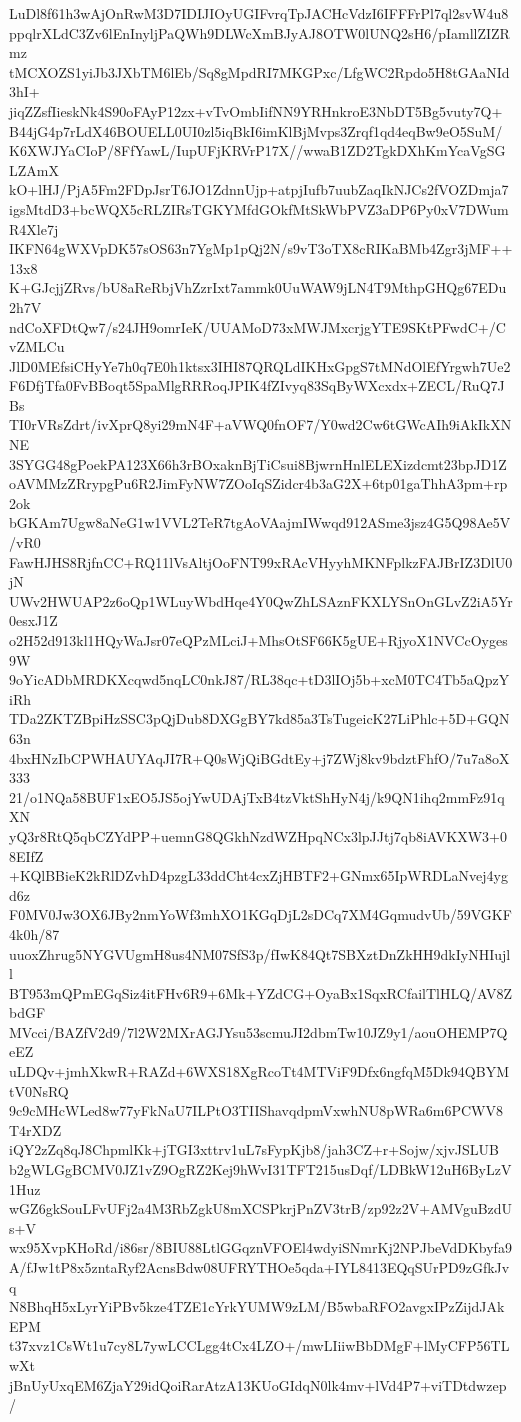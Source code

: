 LuDl8f61h3wAjOnRwM3D7IDIJIOyUGIFvrqTpJACHcVdzI6IFFFrPl7ql2svW4u8
ppqlrXLdC3Zv6lEnInyljPaQWh9DLWcXmBJyAJ8OTW0lUNQ2sH6/pIamllZIZRmz
tMCXOZS1yiJb3JXbTM6lEb/Sq8gMpdRI7MKGPxc/LfgWC2Rpdo5H8tGAaNId3hI+
jiqZZsfIieskNk4S90oFAyP12zx+vTvOmbIifNN9YRHnkroE3NbDT5Bg5vuty7Q+
B44jG4p7rLdX46BOUELL0UI0zl5iqBkI6imKlBjMvps3Zrqf1qd4eqBw9eO5SuM/
K6XWJYaCIoP/8FfYawL/IupUFjKRVrP17X//wwaB1ZD2TgkDXhKmYcaVgSGLZAmX
kO+lHJ/PjA5Fm2FDpJsrT6JO1ZdnnUjp+atpjIufb7uubZaqIkNJCs2fVOZDmja7
igsMtdD3+bcWQX5cRLZIRsTGKYMfdGOkfMtSkWbPVZ3aDP6Py0xV7DWumR4Xle7j
IKFN64gWXVpDK57sOS63n7YgMp1pQj2N/s9vT3oTX8cRIKaBMb4Zgr3jMF++13x8
K+GJcjjZRvs/bU8aReRbjVhZzrIxt7ammk0UuWAW9jLN4T9MthpGHQg67EDu2h7V
ndCoXFDtQw7/s24JH9omrIeK/UUAMoD73xMWJMxcrjgYTE9SKtPFwdC+/CvZMLCu
JlD0MEfsiCHyYe7h0q7E0h1ktsx3IHI87QRQLdIKHxGpgS7tMNdOlEfYrgwh7Ue2
F6DfjTfa0FvBBoqt5SpaMlgRRRoqJPIK4fZIvyq83SqByWXcxdx+ZECL/RuQ7JBs
TI0rVRsZdrt/ivXprQ8yi29mN4F+aVWQ0fnOF7/Y0wd2Cw6tGWcAIh9iAkIkXNNE
3SYGG48gPoekPA123X66h3rBOxaknBjTiCsui8BjwrnHnlELEXizdcmt23bpJD1Z
oAVMMzZRrypgPu6R2JimFyNW7ZOoIqSZidcr4b3aG2X+6tp01gaThhA3pm+rp2ok
bGKAm7Ugw8aNeG1w1VVL2TeR7tgAoVAajmIWwqd912ASme3jsz4G5Q98Ae5V/vR0
FawHJHS8RjfnCC+RQ11lVsAltjOoFNT99xRAcVHyyhMKNFplkzFAJBrIZ3DlU0jN
UWv2HWUAP2z6oQp1WLuyWbdHqe4Y0QwZhLSAznFKXLYSnOnGLvZ2iA5Yr0esxJ1Z
o2H52d913kl1HQyWaJsr07eQPzMLciJ+MhsOtSF66K5gUE+RjyoX1NVCcOyges9W
9oYicADbMRDKXcqwd5nqLC0nkJ87/RL38qc+tD3lIOj5b+xcM0TC4Tb5aQpzYiRh
TDa2ZKTZBpiHzSSC3pQjDub8DXGgBY7kd85a3TsTugeicK27LiPhlc+5D+GQN63n
4bxHNzIbCPWHAUYAqJI7R+Q0sWjQiBGdtEy+j7ZWj8kv9bdztFhfO/7u7a8oX333
21/o1NQa58BUF1xEO5JS5ojYwUDAjTxB4tzVktShHyN4j/k9QN1ihq2mmFz91qXN
yQ3r8RtQ5qbCZYdPP+uemnG8QGkhNzdWZHpqNCx3lpJJtj7qb8iAVKXW3+08EIfZ
+KQlBBieK2kRlDZvhD4pzgL33ddCht4cxZjHBTF2+GNmx65IpWRDLaNvej4ygd6z
F0MV0Jw3OX6JBy2nmYoWf3mhXO1KGqDjL2sDCq7XM4GqmudvUb/59VGKF4k0h/87
uuoxZhrug5NYGVUgmH8us4NM07SfS3p/fIwK84Qt7SBXztDnZkHH9dkIyNHIujll
BT953mQPmEGqSiz4itFHv6R9+6Mk+YZdCG+OyaBx1SqxRCfailTlHLQ/AV8ZbdGF
MVcci/BAZfV2d9/7l2W2MXrAGJYsu53scmuJI2dbmTw10JZ9y1/aouOHEMP7QeEZ
uLDQv+jmhXkwR+RAZd+6WXS18XgRcoTt4MTViF9Dfx6ngfqM5Dk94QBYMtV0NsRQ
9c9cMHcWLed8w77yFkNaU7ILPtO3TIIShavqdpmVxwhNU8pWRa6m6PCWV8T4rXDZ
iQY2zZq8qJ8ChpmlKk+jTGI3xttrv1uL7sFypKjb8/jah3CZ+r+Sojw/xjvJSLUB
b2gWLGgBCMV0JZ1vZ9OgRZ2Kej9hWvI31TFT215usDqf/LDBkW12uH6ByLzV1Huz
wGZ6gkSouLFvUFj2a4M3RbZgkU8mXCSPkrjPnZV3trB/zp92z2V+AMVguBzdUs+V
wx95XvpKHoRd/i86sr/8BIU88LtlGGqznVFOEl4wdyiSNmrKj2NPJbeVdDKbyfa9
A/fJw1tP8x5zntaRyf2AcnsBdw08UFRYTHOe5qda+IYL8413EQqSUrPD9zGfkJvq
N8BhqH5xLyrYiPBv5kze4TZE1cYrkYUMW9zLM/B5wbaRFO2avgxIPzZijdJAkEPM
t37xvz1CsWt1u7cy8L7ywLCCLgg4tCx4LZO+/mwLIiiwBbDMgF+lMyCFP56TLwXt
jBnUyUxqEM6ZjaY29idQoiRarAtzA13KUoGIdqN0lk4mv+lVd4P7+viTDtdwzep/

